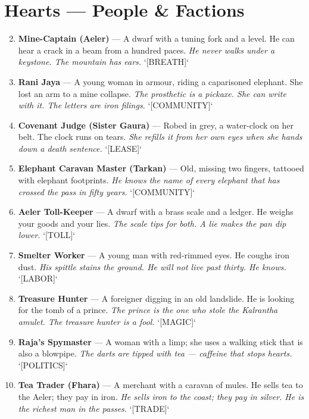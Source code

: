 \section*{Hearts --- People \& Factions}
\label{sec:satrapies-people}
\begin{enumerate}
\setcounter{enumi}{1}
\item \textbf{Mine-Captain (Aeler)} --- A dwarf with a tuning fork and a level. He can hear a crack in a beam from a hundred paces.
  \hfill \textit{He never walks under a keystone. The mountain has ears.} `[BREATH]`
\item \textbf{Rani Jaya} --- A young woman in armour, riding a caparisoned elephant. She lost an arm to a mine collapse.
  \hfill \textit{The prosthetic is a pickaxe. She can write with it. The letters are iron filings.} `[COMMUNITY]`
\item \textbf{Covenant Judge (Sister Gaura)} --- Robed in grey, a water-clock on her belt. The clock runs on tears.
  \hfill \textit{She refills it from her own eyes when she hands down a death sentence.} `[LEASE]`
\item \textbf{Elephant Caravan Master (Tarkan)} --- Old, missing two fingers, tattooed with elephant footprints.
  \hfill \textit{He knows the name of every elephant that has crossed the pass in fifty years.} `[COMMUNITY]`
\item \textbf{Aeler Toll-Keeper} --- A dwarf with a brass scale and a ledger. He weighs your goods and your lies.
  \hfill \textit{The scale tips for both. A lie makes the pan dip lower.} `[TOLL]`
\item \textbf{Smelter Worker} --- A young man with red-rimmed eyes. He coughs iron dust.
  \hfill \textit{His spittle stains the ground. He will not live past thirty. He knows.} `[LABOR]`
\item \textbf{Treasure Hunter} --- A foreigner digging in an old landslide. He is looking for the tomb of a prince.
  \hfill \textit{The prince is the one who stole the Kalrantha amulet. The treasure hunter is a fool.} `[MAGIC]`
\item \textbf{Raja's Spymaster} --- A woman with a limp; she uses a walking stick that is also a blowpipe.
  \hfill \textit{The darts are tipped with tea — caffeine that stops hearts.} `[POLITICS]`
\item \textbf{Tea Trader (Fhara)} --- A merchant with a caravan of mules. He sells tea to the Aeler; they pay in iron.
  \hfill \textit{He sells iron to the coast; they pay in silver. He is the richest man in the passes.} `[TRADE]`

\end{enumerate}
